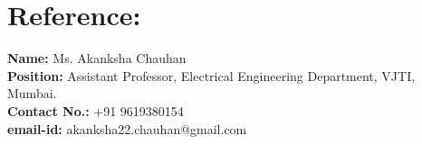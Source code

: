 \documentclass[a4 paper,12pt]{article}
\begin{document}
\begin{minipage}{0.98\textwidth}
	\section{Reference:}
	\vspace{-0.1in}
	\textbf{Name:} Ms. Akanksha Chauhan\\\textbf{Position:} Assistant Professor, Electrical Engineering Department, VJTI, Mumbai.\\\textbf{Contact No.:} +91 9619380154\\\textbf{email-id:} akanksha22.chauhan@gmail.com\\\\
\end{minipage}
\end{document}
